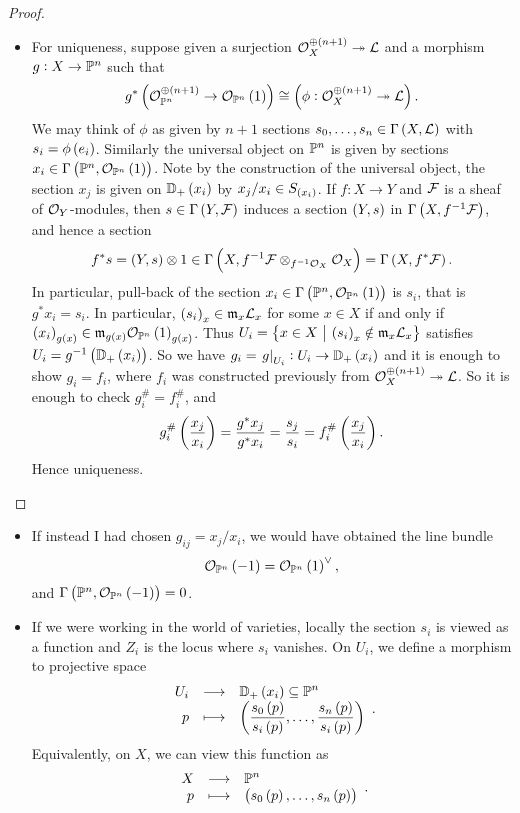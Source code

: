 \begin{proof}
\begin{itemize}
\begin{itemize}
\item For uniqueness, suppose given a surjection $ \OOO_X^{\oplus \br{n + 1}} \twoheadrightarrow \LLL $ and a morphism $ g : X \to \mathbb{P}^n $ such that
$$ g^*\br{\OOO_{\PP^n}^{\oplus \br{n + 1}} \to \OOO_{\PP^n}\br{1}} \cong \br{\phi : \OOO_X^{\oplus \br{n + 1}} \twoheadrightarrow \LLL}. $$
We may think of $ \phi $ as given by $ n + 1 $ sections $ s_0, \dots, s_n \in \Gamma\br{X, \LLL} $ with $ s_i = \phi\br{e_i} $. Similarly the universal object on $ \mathbb{P}^n $ is given by sections $ x_i \in \Gamma\br{\PP^n, \OOO_{\PP^n}\br{1}} $. Note by the construction of the universal object, the section $ x_j $ is given on $ \DD_+\br{x_i} $ by $ x_j / x_i \in S_{\br{x_i}} $. If $ f : X \to Y $ and $ \mathcal{F} $ is a sheaf of $ \mathcal{O}_Y $-modules, then $ s \in \Gamma\br{Y, \FFF} $ induces a section $ \br{Y, s} $ in $ \Gamma\br{X, f^{-1}\FFF} $, and hence a section
$$ f^*s = \br{Y, s} \otimes 1 \in \Gamma\br{X, f^{-1}\FFF \otimes_{f^{-1}\OOO_X} \OOO_X} = \Gamma\br{X, f^*\FFF}. $$
In particular, pull-back of the section $ x_i \in \Gamma\br{\PP^n, \OOO_{\PP^n}\br{1}} $ is $ s_i $, that is $ g^*x_i = s_i $. In particular, $ \br{s_i}_x \in \mmm_x\LLL_x $ for some $ x \in X $ if and only if $ \br{x_i}_{g\br{x}} \in \mmm_{g\br{x}}\OOO_{\PP^n}\br{1}_{g\br{x}} $. Thus $ U_i = \cbr{x \in X \st \br{s_i}_x \notin \mmm_x\LLL_x} $ satisfies $ U_i = g^{-1}\br{\DD_+\br{x_i}} $. So we have $ g_i = \eval{g}_{U_i} : U_i \to \DD_+\br{x_i} $ and it is enough to show $ g_i = f_i $, where $ f_i $ was constructed previously from $ \OOO_X^{\oplus \br{n + 1}} \twoheadrightarrow \LLL $. So it is enough to check $ g_i^\# = f_i^\# $, and
$$ g_i^\#\br{\dfrac{x_j}{x_i}} = \dfrac{g^*x_j}{g^*x_i} = \dfrac{s_j}{s_i} = f_i^\#\br{\dfrac{x_j}{x_i}}. $$
Hence uniqueness.
\end{itemize}
\end{itemize}
\end{proof}

\begin{remark*}
\hfill
\begin{itemize}
\item If instead I had chosen $ g_{ij} = x_j / x_i $, we would have obtained the line bundle
$$ \OOO_{\PP^n}\br{-1} = \OOO_{\PP^n}\br{1}^\vee, $$
and $ \Gamma\br{\PP^n, \OOO_{\PP^n}\br{-1}} = 0 $.
\item If we were working in the world of varieties, locally the section $ s_i $ is viewed as a function and $ Z_i $ is the locus where $ s_i $ vanishes. On $ U_i $, we define a morphism to projective space
$$ \function{U_i}{\DD_+\br{x_i} \subseteq \PP^n}{p}{\br{\dfrac{s_0\br{p}}{s_i\br{p}}, \dots, \dfrac{s_n\br{p}}{s_i\br{p}}}}. $$
Equivalently, on $ X $, we can view this function as
$$ \function{X}{\PP^n}{p}{\br{s_0\br{p}, \dots, s_n\br{p}}}. $$
\end{itemize}
\end{remark*}

